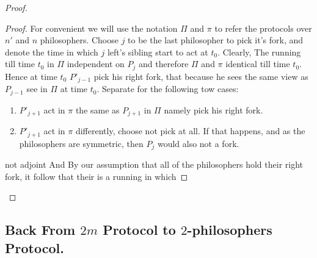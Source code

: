 \documentclass[manuscript,screen,review]{acmart}
\begin{document}
\begin{proof}
  \begin{proof}
    For convenient we will use the notation $\Pi$ and $\pi$ to refer the protocols over $n'$ and $n$ philosophers. Choose $j$ to be the last philosopher to pick it's fork, and denote the time in which $j$ left's sibling start to act at $t_{0}$. Clearly, The running till time $t_{0}$ in $\Pi$  independent on $P_{j}$ and therefore $\Pi$ and $\pi$ identical till time $t_{0}$. Hence at time $t_{0}$ $P'_{j-1}$ pick his right fork, that because he sees the same view as $P_{j-1}$ see in $\Pi$ at time $t_{0}$. Separate for the following tow cases: 
    \begin{enumerate}
      \item $P'_{j+1}$ act in $\pi$ the same as $P_{j+1}$ in $\Pi$ namely pick his right fork.  
      \item $P'_{j+1}$ act in $\pi$ differently, choose not pick at all. If that happens, and as the philosophers are symmetric, then $P_{j}$ would also not a fork.    
    \end{enumerate}
    not adjoint  And By our assumption that all of the philosophers hold their right fork, it follow that their is a running in which 
  \end{proof}

\end{proof}

\subsection{ Back From $2m$ Protocol to $2$-philosophers Protocol.}
\end{document}
